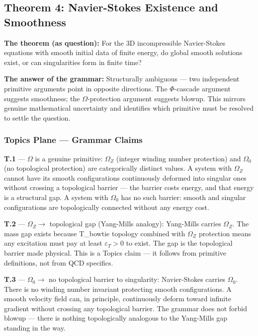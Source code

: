 \documentclass[11pt,a4paper]{article}
\begin{document}
\subsection{Theorem 4: Navier-Stokes Existence and Smoothness}

\textbf{The theorem (as question):} For the 3D incompressible Navier-Stokes equations with smooth initial data of finite energy, do global smooth solutions exist, or can singularities form in finite time?

\textbf{The answer of the grammar:} Structurally ambiguous --- two independent primitive arguments point in opposite directions. The $\Phi$-cascade argument suggests smoothness; the $\Omega$-protection argument suggests blowup. This mirrors genuine mathematical uncertainty and identifies which primitive must be resolved to settle the question.

\subsubsection{Topics Plane --- Grammar Claims}

\textbf{T.1} --- $\Omega$ is a genuine primitive: $\Omega_Z$ (integer winding number protection) and $\Omega_0$ (no topological protection) are categorically distinct values. A system with $\Omega_Z$ cannot have its smooth configurations continuously deformed into singular ones without crossing a topological barrier --- the barrier costs energy, and that energy is a structural gap. A system with $\Omega_0$ has no such barrier: smooth and singular configurations are topologically connected without any energy cost.

\textbf{T.2} --- $\Omega_Z \to$ topological gap (Yang-Mills analogy): Yang-Mills carries $\Omega_Z$. The mass gap exists because T\_bowtie topology combined with $\Omega_Z$ protection means any excitation must pay at least $\varepsilon_T > 0$ to exist. The gap is the topological barrier made physical. This is a Topics claim --- it follows from primitive definitions, not from QCD specifics.

\textbf{T.3} --- $\Omega_0 \to$ no topological barrier to singularity: Navier-Stokes carries $\Omega_0$. There is no winding number invariant protecting smooth configurations. A smooth velocity field can, in principle, continuously deform toward infinite gradient without crossing any topological barrier. The grammar does not forbid blowup --- there is nothing topologically analogous to the Yang-Mills gap standing in the way.
\end{document}
